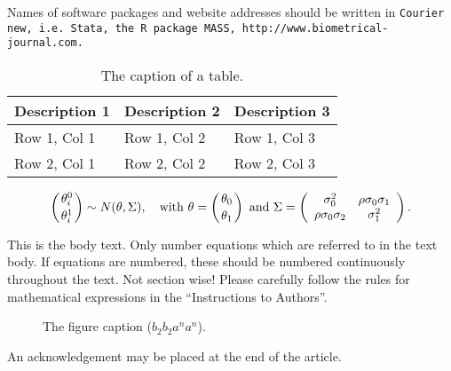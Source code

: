 \documentclass[bimj,fleqn]{w-art}\usepackage[]{graphicx}\usepackage[]{color}
\theoremstyle{plain}
\theoremstyle{definition}
\begin{document}
  \noindent Names of software packages and website addresses should be written in {\tt{Courier new, i.e. Stata, the R package
  MASS, http://www.biometrical-journal.com.}}


  \begin{table}[htb]
  \begin{center}
  \caption{The caption of a table.}
  \begin{tabular}{lll}
  \hline
  Description 1 & Description 2 & Description 3\\
  \hline
  Row 1, Col 1 & Row 1, Col 2 & Row 1, Col 3\\
  Row 2, Col 1 & Row 2, Col 2 & Row 2, Col 3\\
  \hline
  \end{tabular}
  \end{center}
  \end{table}
  \begin{equation}
  \left({\theta^{0}_{i}}\atop{\theta^{1}_{i}}\right) \sim N(\theta,\Sigma),\quad {\mathrm{with}}\
  {{\theta}} = \left({\theta_{0}}\atop{\theta_{1}}\right)\ {\mathrm{and}}\ \Sigma =
  \left(\begin{array}{cc}
  \sigma^{2}_{0} & \rho\sigma_{0}\sigma_{1}\\
  \rho\sigma_{0}\sigma_{2} & \sigma^{2}_{1}
  \end{array}\right).
  \end{equation}

  \noindent This is the body text. Only number equations which are referred to in the text body. If equations
  are numbered, these should be numbered continuously throughout the text. Not section wise! Please
  carefully follow the rules for mathematical expressions in the ``Instructions to Authors''.

  \begin{figure}[htb]
  \begin{center}
  \caption{The figure caption ($b_{2}b_{2}a^{n}a^{n}$).}
  \end{center}
  \end{figure}
  \begin{acknowledgement}
  An acknowledgement may be placed at the end of the article.
  \end{acknowledgement}
  \vspace*{1pc}


\end{document}
